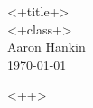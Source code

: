 \documentclass[12pt]{article}  %
\begin{document}
\begin{flushright} <+title+> \\ <+class+> \\ Aaron Hankin\\ \today 
\end{flushright}  	
\vspace{0.5cm}
<++>
\end{document}
